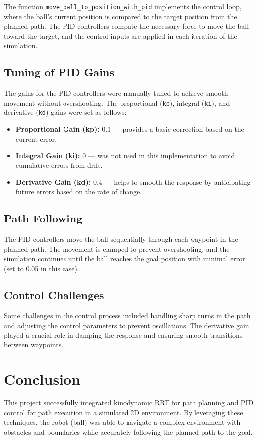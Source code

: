 \documentclass[12pt]{article}
\begin{document}
The function \texttt{move\_ball\_to\_position\_with\_pid} implements the control loop, where the ball’s current position is compared to the target position from the planned path. The PID controllers compute the necessary force to move the ball toward the target, and the control inputs are applied in each iteration of the simulation.

\subsection{Tuning of PID Gains}
The gains for the PID controllers were manually tuned to achieve smooth movement without overshooting. The proportional (\texttt{kp}), integral (\texttt{ki}), and derivative (\texttt{kd}) gains were set as follows:
\begin{itemize}
    \item \textbf{Proportional Gain (kp):} 0.1 — provides a basic correction based on the current error.
    \item \textbf{Integral Gain (ki):} 0 — was not used in this implementation to avoid cumulative errors from drift.
    \item \textbf{Derivative Gain (kd):} 0.4 — helps to smooth the response by anticipating future errors based on the rate of change.
\end{itemize}

\subsection{Path Following}
The PID controllers move the ball sequentially through each waypoint in the planned path. The movement is clamped to prevent overshooting, and the simulation continues until the ball reaches the goal position with minimal error (set to 0.05 in this case).

\subsection{Control Challenges}
Some challenges in the control process included handling sharp turns in the path and adjusting the control parameters to prevent oscillations. The derivative gain played a crucial role in damping the response and ensuring smooth transitions between waypoints.

\section{Conclusion}
This project successfully integrated kinodynamic RRT for path planning and PID control for path execution in a simulated 2D environment. By leveraging these techniques, the robot (ball) was able to navigate a complex environment with obstacles and boundaries while accurately following the planned path to the goal.
\end{document}
